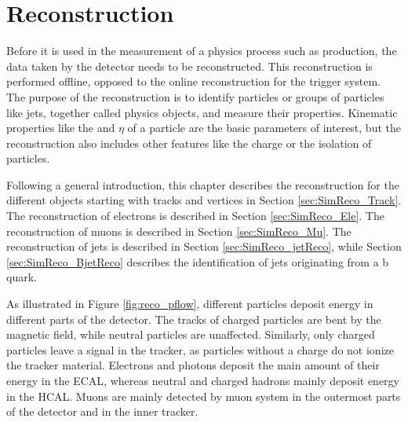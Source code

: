 
\chapter{Reconstruction}
\label{sec:SimReco_Reco}

Before it is used in the measurement of a physics process such as \ttbar production, the data taken by the detector needs to be reconstructed.
This reconstruction is performed offline, opposed to the online reconstruction for the trigger system.
The purpose of the reconstruction is to identify particles or groups of particles like jets, together called physics objects, and measure their properties.
Kinematic properties like the \pt and $\eta$ of a particle are the basic parameters of interest, but the reconstruction also includes other features like the charge or the isolation of particles.

Following a general introduction, this chapter describes the reconstruction for the different objects starting with tracks and vertices in Section \ref{sec:SimReco_Track}.
The reconstruction of electrons is described in Section \ref{sec:SimReco_Ele}.
The reconstruction of muons is described in Section \ref{sec:SimReco_Mu}.
The reconstruction of jets is described in Section \ref{sec:SimReco_jetReco}, while Section \ref{sec:SimReco_BjetReco} describes the identification of jets originating from a b quark.

As illustrated in Figure \ref{fig:reco_pflow}, different particles deposit energy in different parts of the detector.
The tracks of charged particles are bent by the magnetic field, while neutral particles are unaffected.
Similarly, only charged particles leave a signal in the tracker, as particles without a charge do not ionize the tracker material.
Electrons and photons deposit the main amount of their energy in the ECAL, whereas neutral and charged hadrons mainly deposit energy in the HCAL.
Muons are mainly detected by muon system in the outermost parts of the detector and in the inner tracker.

